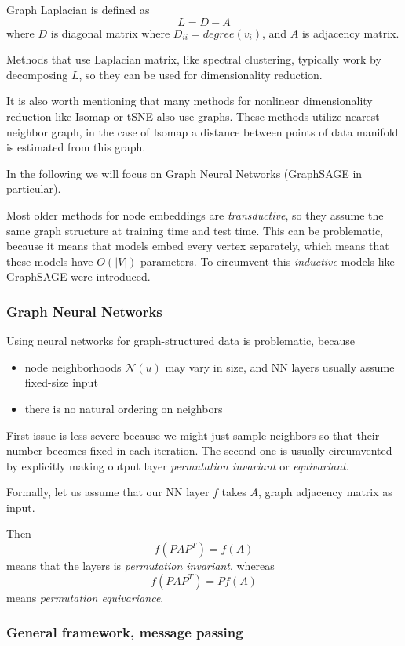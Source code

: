 \documentclass[11pt]{report}
\begin{document}
Graph Laplacian is defined as $$L = D - A$$ where \(D\) is diagonal matrix where \(D_{ii} = degree(v_i)\), and \(A\) is adjacency matrix.

Methods that use Laplacian matrix, like spectral clustering, typically work by decomposing \(L\), so they can be used for dimensionality reduction.

It is also worth mentioning that many methods for nonlinear dimensionality reduction like Isomap or tSNE also use graphs.
These methods utilize nearest-neighbor graph, in the case of Isomap a distance between points of data manifold is estimated from this graph.

In the following we will focus on Graph Neural Networks (GraphSAGE in particular).

Most older methods for node embeddings are \emph{transductive}, so they assume the same graph structure at training time and test time.
This can be problematic, because it means that models embed every vertex separately, which means that these models have \(O(|V|)\) parameters.
To circumvent this \emph{inductive} models like GraphSAGE were introduced.

\subsubsection{Graph Neural Networks}

Using neural networks for graph-structured data is problematic, because
\begin{itemize}
\item node neighborhoods \(\mathcal{N}(u)\) may vary in size, and NN layers usually assume fixed-size input
\item there is no natural ordering on neighbors
\end{itemize}

First issue is less severe because we might just sample neighbors so that their number becomes fixed in each iteration.
The second one is usually circumvented by explicitly making output layer \emph{permutation invariant} or \emph{equivariant}.

Formally, let us assume that our NN layer \(f\) takes \(A\), graph adjacency matrix as input.

Then $$f(PAP^T) = f(A)$$ means that the layers is \emph{permutation invariant}, whereas  
$$f(PAP^T) = P f(A)$$ means \emph{permutation equivariance}. 

\subsubsection{General framework, message passing}
\end{document}
